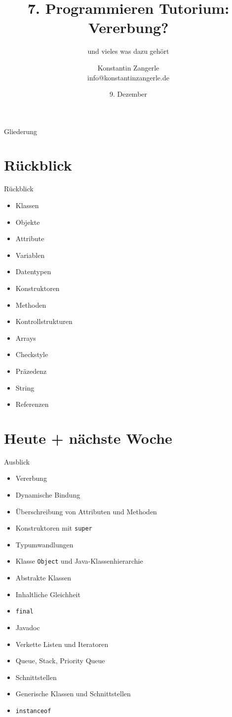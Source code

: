 \documentclass[18pt]{beamer}
\title[Programmieren Tutorium]{7. Programmieren Tutorium:\texorpdfstring{\\}{}Vererbung?}
\subtitle{und vieles was dazu gehört}
\author{Konstantin Zangerle \texorpdfstring{\\}{} info@konstantinzangerle.de}
\date{9. Dezember}
\institute{Chair for Software Design and Quality}
\begin{document}

\begin{frame}
\titlepage
\end{frame}

\begin{frame}{Gliederung}
\tableofcontents
\end{frame}
\section{Rückblick}
\begin{frame}{Rückblick}
 \begin{itemize}
  \item Klassen
  \item Objekte
  \item Attribute
  \item Variablen
  \item Datentypen
  \item Konstruktoren
  \item Methoden
  \item Kontrollstrukturen
  \item Arrays
  \item Checkstyle
  \item Präzedenz
  \item String
  \item Referenzen
 \end{itemize}
\end{frame}

\section{Heute + nächste Woche}
\begin{frame}[fragile]{Ausblick}
\begin{itemize}
 \item Vererbung
 \item Dynamische Bindung
 \item Überschreibung von Attributen und Methoden
 \item Konstruktoren mit \verb|super|
 \item Typumwandlungen
 \item Klasse \verb|Object| und Java-Klassenhierarchie
 \item Abstrakte Klassen
 \item Inhaltliche Gleichheit
 \item \verb|final|
 \item Javadoc
 \item Verkette Listen und Iteratoren
 \item Queue, Stack, Priority Queue
 \item Schnittstellen
 \item Generische Klassen und Schnittstellen
  \item \verb|instanceof|
\end{itemize}
\end{frame}
\end{document}
